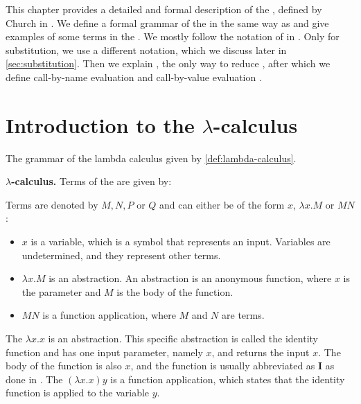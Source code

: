 


This chapter provides a detailed and formal description of the \lc, defined by Church in \cite{original-lambda-calc}. 
We define a formal grammar of the \lc in the same way as \cite{espritosanto_et_al:LIPIcs:2019:10525} and give examples of some terms in the \lc.
We mostly follow the notation of \lterms in \cite{HindleySeldin2008}.
Only for substitution, we use a different notation, which we discuss later in \cref{sec:substitution}.
Then we explain \br, the only way to reduce \lterms \cite{original-lambda-calc}, after which we define call-by-name evaluation and call-by-value evaluation \cite{PLOTKIN1975125}.

\section{\texorpdfstring{Introduction to the \boldmath$\lambda$-calculus}{Introduction to the Lambda Calculus}}
The grammar of the lambda calculus given by \cref{def:lambda-calculus}. 

\begin{definition}
  \label{def:lambda-calculus}
  \textbf{\boldmath${\lambda}$-calculus.} Terms of the \lc are given by: \\
  \begin{grammar}{
 }
  \end{grammar}
\end{definition}

\vspace{10pt}
Terms are denoted by $M, N, P$ or $Q$ and can either be of the form $x$, $\lambda x.M$ or $M N$:
\begin{itemize}[noitemsep]
  \item $x$ is a variable, which is a symbol that represents an input. Variables are undetermined, and they represent other terms.
  \item $\lambda x.M$ is an abstraction. An abstraction is an anonymous function, where $x$ is the parameter and $M$ is the body of the function.
  \item $M N$ is a function application, where $M$ and $N$ are terms.
\end{itemize}

The \lterm $\lambda x. x$ is an abstraction. This specific abstraction is called the identity function and has one input parameter, namely $x$, and returns the input $x$.
The body of the function is also $x$, and the function is usually abbreviated as $\mathbf{I}$ as done in \cite{curry1958combinatory}. 
The \lterm $(\lambda x. x) y$ is a function application, which states that the identity function is applied to the variable $y$.
